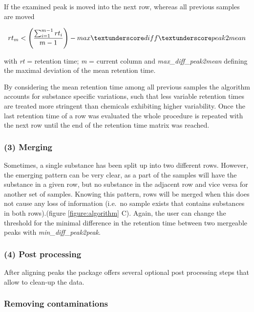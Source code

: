 If the examined peak is moved into the next row, whereas all previous
samples are moved

\begin{equation}
rt_{m} < \left(\frac{\sum_{i=1}^{m-1}rt_{i}}{m-1}\right) - max\textunderscore diff\textunderscore peak2mean
\end{equation}

with \emph{rt} = retention time; \emph{m} = current column and
\emph{max\_diff\_peak2mean} defining the maximal deviation of the mean
retention time.

By considering the mean retention time among all previous samples the
algorithm accounts for substance specific variations, such that less
variable retention times are treated more stringent than chemicals
exhibiting higher variability. Once the last retention time of a row was
evaluated the whole procedure is repeated with the next row until the
end of the retention time matrix was reached.

\subsubsection{(3) Merging}\label{merging}

Sometimes, a single substance has been split up into two different rows.
However, the emerging pattern can be very clear, as a part of the
samples will have the substance in a given row, but no substance in the
adjacent row and vice versa for another set of samples. Knowing this
pattern, rows will be merged when this does not cause any loss of
information (i.e.~no sample exists that contains substances in both
rows).(figure \ref{figure:algorithm} C). Again, the user can change the
threshold for the minimal difference in the retention time between two
mergeable peaks with \emph{min\_diff\_peak2peak}. \par 

\subsubsection{(4) Post processing}\label{post-processing}

After aligning peaks the package offers several optional post processing
steps that allow to clean-up the data.

\subsubsection{Removing contaminations}\label{removing-contaminations}

